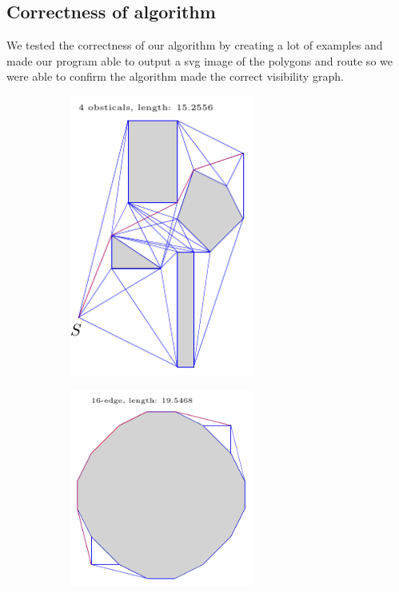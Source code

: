 \subsection{Correctness of algorithm}
We tested the correctness of our algorithm by creating a lot of examples and
made our program able to output a svg image of the polygons and route so we
were able to confirm the algorithm made the correct visibility graph.
\begin{figure}[H]
	\caption{Examples of figures for correctness}
	\begin{subfigure}{.5\textwidth}
		\includegraphics[width=6cm]{figures/correctness1.pdf}
		\caption{}
		\label{fig:correctness_1}
	\end{subfigure}
	\begin{subfigure}{.5\textwidth}
		\includegraphics[width=6cm]{figures/correctness2.pdf}
		\caption{}
		\label{fig:correctness_2}
	\end{subfigure}
\end{figure}

